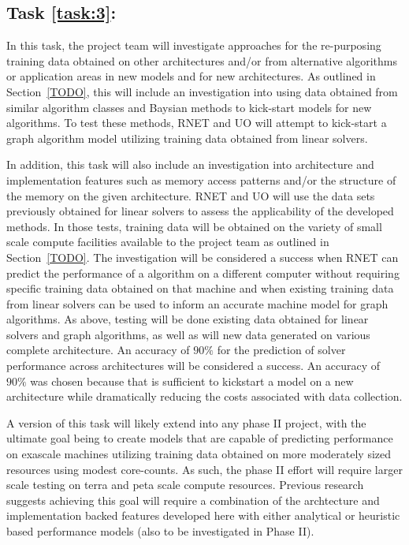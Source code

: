 \label{task:3}
\subsection{Task \ref{task:3}: }
In this task, the project team will investigate approaches for the re-purposing training data obtained on other architectures and/or from alternative algorithms or application areas in new models and for new architectures. As outlined in Section~\ref{TODO}, this will include an investigation into using data obtained from similar algorithm classes and Baysian methods to kick-start models for new algorithms. To test these methods, RNET and UO will attempt to kick-start a graph algorithm model utilizing training data obtained from linear solvers. 

In addition, this task will also include an investigation into architecture and implementation features such as memory access patterns and/or the structure of the memory on the given architecture. RNET and UO will use the data sets previously obtained for linear solvers to assess the applicability of the developed methods. In those tests, training data will be obtained on the variety of small scale compute facilities available to the project team as outlined in Section~\ref{TODO}. The investigation will be considered a success when RNET can predict the performance of a algorithm on a different computer without requiring specific training data obtained on that machine and when existing training data from linear solvers can be used to inform an accurate machine model for graph algorithms. As above, testing will be done existing data obtained for linear solvers and graph algorithms, as well as will new data generated on various complete architecture. An accuracy of $90\%$ for the prediction of solver performance across architectures will be considered a success. An accuracy of $90\%$ was chosen because that is sufficient to kickstart a model on a new architecture while dramatically reducing the costs associated with data collection. 

A version of this task will likely extend into any phase II project, with the ultimate goal being to create models that are capable of predicting performance on exascale machines utilizing training data obtained on more moderately sized resources using modest core-counts. As such, the phase II effort will require larger scale testing on terra and peta scale compute resources. Previous research suggests achieving this goal will require a combination of the archtecture and implementation backed features developed here with either analytical or heuristic based performance models (also to be investigated in Phase II).  

